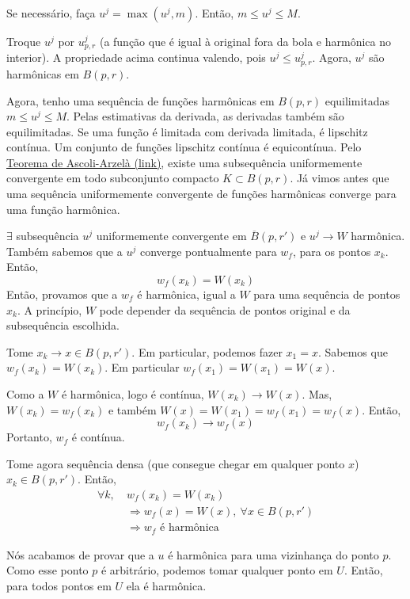 \documentclass[11pt]{article}
\begin{document}
Se necessário, faça \(u^j = \max(u^j, m)\). Então, \(m \leq u^j \leq M\).

Troque \(u^j\) por \(u^j_{p,r}\) (a função que é igual à original fora da bola e harmônica no interior). A propriedade acima continua valendo, pois \(u^j \leq u^j_{p,r}\). Agora, \(u^j\) são harmônicas em \(B(p,r)\).

Agora, tenho uma sequência de funções harmônicas em \(B(p,r)\) equilimitadas \(m \leq u^j \leq M\). Pelas estimativas da derivada, as derivadas também são equilimitadas. Se uma função é limitada com derivada limitada, é lipschitz contínua. Um conjunto de funções lipschitz contínua é equicontínua. Pelo \href{https://en.wikipedia.org/wiki/Arzel\%C3\%A0\%E2\%80\%93Ascoli_theorem}{Teorema de Ascoli-Arzelà (link)}, existe uma subsequência uniformemente convergente em todo subconjunto compacto \(K \subset B(p,r)\). Já vimos antes que uma sequência uniformemente convergente de funções harmônicas converge para uma função harmônica.

\(\exists\) subsequência \(u^j\) uniformemente convergente em \(\overline{B}(p, r')\) e \(u^j \rightarrow W\) harmônica. Também sabemos que a \(u^j\) converge pontualmente para \(w_f\), para os pontos \(x_k\). Então, \[w_f(x_k) = W(x_k)\]Então, provamos que a \(w_f\) é harmônica, igual a \(W\) para uma sequência de pontos \(x_k\). A princípio,  \(W\) pode depender da sequência de pontos original e da subsequência escolhida.

\medskip

Tome \(x_k \rightarrow x \in B(p, r')\). Em particular, podemos fazer \(x_1 = x\). Sabemos que \(w_f(x_k) = W(x_k)\). Em particular \(w_f(x_1)=W(x_1)=W(x)\).

Como a \(W\) é harmônica, logo é contínua, \(W(x_k)\rightarrow W(x)\). Mas, \(W(x_k) = w_f(x_k)\) e também \(W(x) = W(x_1)=w_f(x_1) = w_f(x)\). Então, \[w_f(x_k) \rightarrow w_f(x)\] Portanto, \(w_f\) é contínua.

Tome agora sequência densa (que consegue chegar em qualquer ponto \(x\)) \(x_k \in B(p,r')\). Então,\vspace{-4mm} \begin{align*}
	\forall k,\ & w_f(x_k)=W(x_k) \\
	&\Rightarrow w_f(x) = W(x),\ \forall x \in B(p, r')\\
	&\Rightarrow w_f \text{ é harmônica}
\end{align*} 

Nós acabamos de provar que a \(u\) é harmônica para uma vizinhança do ponto \(p\). Como esse ponto \(p\) é arbitrário, podemos tomar qualquer ponto em \(U\). Então, para todos pontos em \(U\) ela é harmônica.
\end{document}

